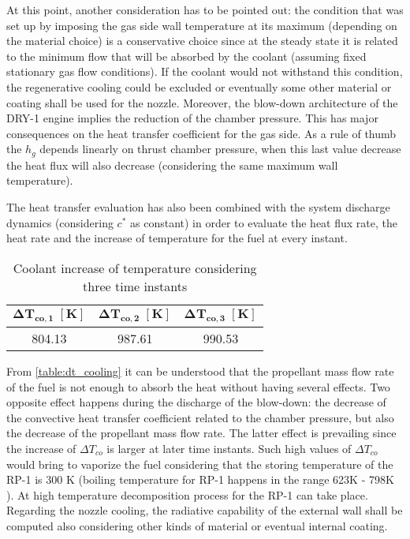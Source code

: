 At this point, another consideration has to be pointed out: the condition that was set up by imposing the gas side wall temperature at its maximum (depending on the material choice) is a conservative choice since at the steady state it is related to the minimum flow that will be absorbed by the coolant (assuming fixed stationary gas flow conditions). If the coolant would not withstand this condition, the regenerative cooling could be excluded or eventually some other material or coating shall be used for the nozzle. Moreover, the blow-down architecture of the DRY-1 engine implies the reduction of the chamber pressure. This has major consequences on the heat transfer coefficient for the gas side. As a rule of thumb the $h_g$ depends linearly on thrust chamber pressure, when this last value decrease the heat flux will also decrease (considering the same maximum wall temperature). 

The heat transfer evaluation has also been combined with the system discharge dynamics (considering $c^*$ as constant) in order to evaluate the heat flux rate, the heat rate and the increase of temperature for the fuel at every instant. 

\begin{table}[H]
    \renewcommand{\arraystretch}{1.5}
    \centering
    \begin{tabular}{|c|c|c|}
        \hline
        $\boldsymbol{\Delta T_{co,1} \; [\textbf{K}]}$ & $\boldsymbol{\Delta T_{co,2} \; [\textbf{K}]}$ & $\boldsymbol{\Delta T_{co,3} \; [\textbf{K}]}$ \\
        \hline
        \hline
        804.13 & 987.61 & 990.53 \\
        \hline
    \end{tabular}
    \caption{Coolant increase of temperature considering three time instants}
    \label{table:dt_cooling}
\end{table}


From \autoref{table:dt_cooling} it can be understood that the propellant mass flow rate of the fuel is not enough to absorb the heat without having several effects. Two opposite effect happens during the discharge of the blow-down: the decrease of the convective heat transfer coefficient related to the chamber pressure, but also the decrease of the propellant mass flow rate. The latter effect is prevailing since the increase of $\Delta T_{co}$ is larger at later time instants. Such high values of $\Delta T_{co}$ would bring to vaporize the fuel considering that the storing temperature of the RP-1 is 300 K (boiling temperature for RP-1 happens in the range 623K - 798K \cite{rp_1_temp}). At high temperature decomposition process for the RP-1 can take place. Regarding the nozzle cooling, the radiative capability of the external wall shall be computed also considering other kinds of material or eventual internal coating.

